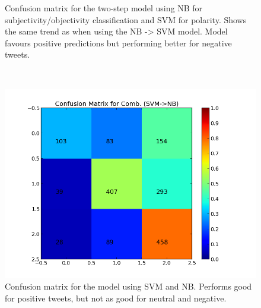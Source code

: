 \begin{minipage}[s]{\linewidth}
\begin{minipage}{0.45\linewidth}
\begin{figure}[H]
           \caption[Plot showing the confusion matrix for two-step NB -> MaxEnt]{Confusion matrix for the two-step model using NB for subjectivity/objectivity classification and SVM for polarity. Shows the same trend as when using the NB -> SVM model. Model favours positive predictions but performing better for negative tweets.}
           \label{fig:confmat_nb_maxent}
          \end{figure}
     \end{minipage} \\
     
     \begin{minipage}{0.45\linewidth}
           \begin{figure}[H]
                \includegraphics[width=\linewidth]{../img/plots/grid/confusion_matrix_Comb-SVM-NB.png}
            \caption[Plot showing the confusion matrix for two-step SVM -> NB]{Confusion matrix for the model using SVM and NB. Performs good for positive tweets, but not as good for neutral and negative.}
            \label{fig:confmat_svm_nb}
           \end{figure}
      \end{minipage}
      \hspace{0.05\linewidth}
      \begin{minipage}{0.45\linewidth}
           \begin{figure}[H]

\end{figure}
\end{minipage}
\end{minipage}
